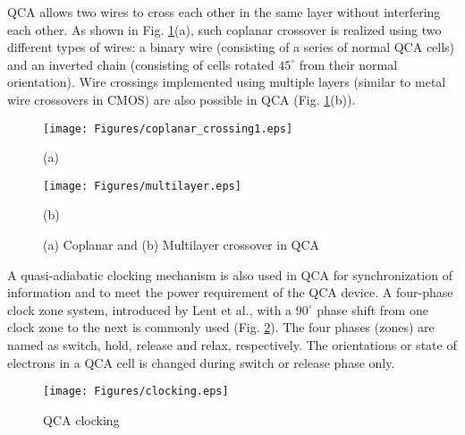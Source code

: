 \documentclass[conference]{IEEEtran}
\begin{document}
QCA allows two wires to cross each other in the same layer without interfering each other.
As shown in Fig. \ref{fig:Multilayer crossing}(a), such coplanar crossover\cite{lent_jap1994} is realized using two different types of wires: a binary wire (consisting of a series of normal QCA cells) and an inverted chain (consisting of cells rotated $45^\circ$ from their normal orientation).
Wire crossings implemented using multiple layers (similar to metal wire crossovers in CMOS) are also possible in QCA (Fig. \ref{fig:Multilayer crossing}(b)). 
\begin{figure}[ht]
\center
\begin{minipage}[b]{0.4\linewidth}
\centering
\texttt{[image: Figures/coplanar\_crossing1.eps]}
\centerline{(a)}
\end{minipage}
\hspace{0.8cm}
\begin{minipage}[b]{0.45\linewidth}
\centering
\texttt{[image: Figures/multilayer.eps]}
\centerline{(b)}
\end{minipage}
\caption{\small (a) Coplanar and (b) Multilayer crossover in QCA}
\label{fig:Multilayer crossing}
\end{figure}
A quasi-adiabatic clocking mechanism is also used in QCA for synchronization of information and to meet the  power requirement of the QCA device.
A four-phase clock zone system, introduced by Lent et al.\cite{lent_tnano1993}, with a $90^\circ$ phase shift from one clock zone to the next is commonly used (Fig. \ref{fig:QCA_Clocking}). 
The four phases (zones) are named as switch, hold, release and relax, respectively.
The orientations or state of electrons in a QCA cell is changed during switch or release phase only.
\begin{figure}[!htb]
\centering
\texttt{[image: Figures/clocking.eps]}
\caption{QCA clocking}
\label{fig:QCA_Clocking}
\end{figure}
\end{document}
